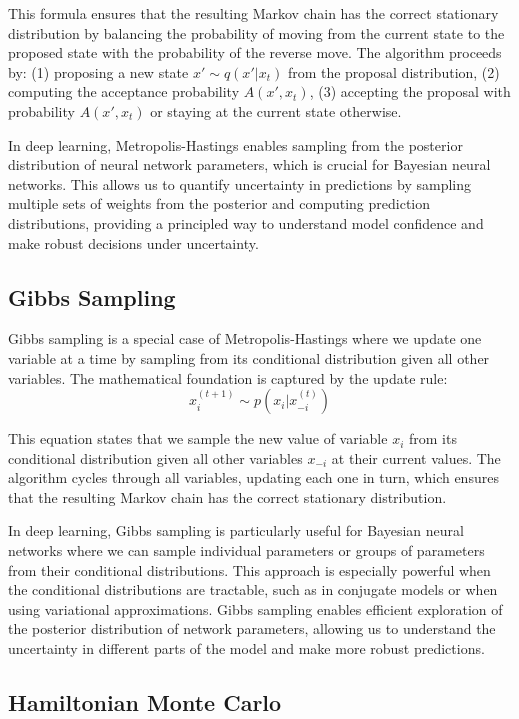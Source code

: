 This formula ensures that the resulting Markov chain has the correct stationary distribution by balancing the probability of moving from the current state to the proposed state with the probability of the reverse move. The algorithm proceeds by: (1) proposing a new state $x' \sim q(x'|x_t)$ from the proposal distribution, (2) computing the acceptance probability $A(x', x_t)$, (3) accepting the proposal with probability $A(x', x_t)$ or staying at the current state otherwise.

In deep learning, Metropolis-Hastings enables sampling from the posterior distribution of neural network parameters, which is crucial for Bayesian neural networks. This allows us to quantify uncertainty in predictions by sampling multiple sets of weights from the posterior and computing prediction distributions, providing a principled way to understand model confidence and make robust decisions under uncertainty.

\subsection{Gibbs Sampling}

Gibbs sampling is a special case of Metropolis-Hastings where we update one variable at a time by sampling from its conditional distribution given all other variables. The mathematical foundation is captured by the update rule:
\begin{equation}
x_i^{(t+1)} \sim p(x_i | x_{-i}^{(t)})
\end{equation}

This equation states that we sample the new value of variable $x_i$ from its conditional distribution given all other variables $x_{-i}$ at their current values. The algorithm cycles through all variables, updating each one in turn, which ensures that the resulting Markov chain has the correct stationary distribution.

In deep learning, Gibbs sampling is particularly useful for Bayesian neural networks where we can sample individual parameters or groups of parameters from their conditional distributions. This approach is especially powerful when the conditional distributions are tractable, such as in conjugate models or when using variational approximations. Gibbs sampling enables efficient exploration of the posterior distribution of network parameters, allowing us to understand the uncertainty in different parts of the model and make more robust predictions.

\subsection{Hamiltonian Monte Carlo}

